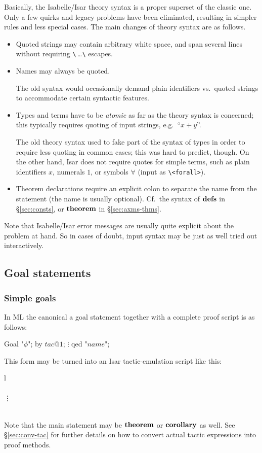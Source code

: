 Basically, the Isabelle/Isar theory syntax is a proper superset of the classic
one.  Only a few quirks and legacy problems have been eliminated, resulting in
simpler rules and less special cases.  The main changes of theory syntax are
as follows.

\begin{itemize}
\item Quoted strings may contain arbitrary white space, and span several lines
  without requiring \verb,\,\,\dots\verb,\, escapes.
\item Names may always be quoted.
  
  The old syntax would occasionally demand plain identifiers vs.\ quoted
  strings to accommodate certain syntactic features.
\item Types and terms have to be \emph{atomic} as far as the theory syntax is
  concerned; this typically requires quoting of input strings, e.g.\ ``$x +
  y$''.
  
  The old theory syntax used to fake part of the syntax of types in order to
  require less quoting in common cases; this was hard to predict, though.  On
  the other hand, Isar does not require quotes for simple terms, such as plain
  identifiers $x$, numerals $1$, or symbols $\forall$ (input as
  \verb,\<forall>,).
\item Theorem declarations require an explicit colon to separate the name from
  the statement (the name is usually optional).  Cf.\ the syntax of ${\mathord{\mathbf{defs}}}$ in
  \S\ref{sec:consts}, or ${\mathord{\mathbf{theorem}}}$ in \S\ref{sec:axms-thms}.
\end{itemize}

Note that Isabelle/Isar error messages are usually quite explicit about the
problem at hand.  So in cases of doubt, input syntax may be just as well tried
out interactively.


\subsection{Goal statements}\label{sec:conv-goal}

\subsubsection{Simple goals}

In ML the canonical a goal statement together with a complete proof script is
as follows:
\begin{ttbox}
 Goal "\(\phi\)";
 by \(tac@1\);
   \(\vdots\)
 qed "\(name\)";
\end{ttbox}
This form may be turned into an Isar tactic-emulation script like this:
\begin{matharray}{l}
   \\
  \quad {} \\
  \qquad \vdots \\
  \quad \DONE \\
\end{matharray}
Note that the main statement may be ${\mathord{\mathbf{theorem}}}$ or ${\mathord{\mathbf{corollary}}}$ as
well.  See \S\ref{sec:conv-tac} for further details on how to convert actual
tactic expressions into proof methods.

